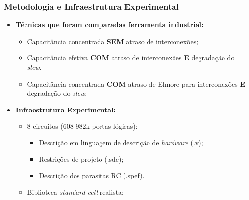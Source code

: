 \documentclass[10pt,a4paper]{beamer}
\begin{document}
		\begin{frame}[t]
			\frametitle{Metodologia e Infraestrutura Experimental}
			\begin{center}
				\begin{itemize}
					\item \textbf{Técnicas que foram comparadas ferramenta industrial:}	\\
						\begin{itemize}
							\item Capacitância concentrada \textbf{SEM} atraso de interconexões;
							\item Capacitância efetiva \textbf{COM} atraso de interconexões \textbf{E} degradação do \textit{slew}.							
							\item Capacitância concentrada \textbf{COM} atraso de Elmore para interconexões \textbf{E} degradação do \textit{slew};
							
						\end{itemize} \pause
					\item \textbf{Infraestrutura Experimental: } \\
						\begin{itemize}
						\item 8 circuitos (608-982k portas lógicas): \\
						\begin{itemize}
							\item Descrição em linguagem de descrição de \textit{hardware} (.v); \\
							\item Restrições de projeto (.sdc);\\
							\item Descrição dos parasitas RC (.spef).
						\end{itemize}
						\item Biblioteca \textit{standard cell} realista; \\
					\end{itemize} 
				\end{itemize}
				
			\end{center}
		\end{frame}			
		
\end{document}
